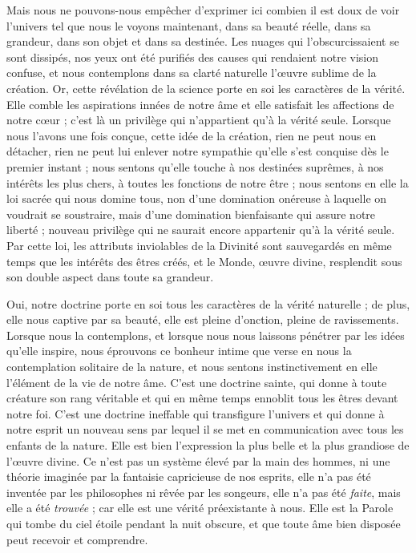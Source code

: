 \documentclass[a4paper, 11pt, oneside]{article}
\begin{document}
Mais nous ne pouvons-nous empêcher d'exprimer ici combien il est doux de voir l'univers tel que nous le voyons maintenant, dans sa beauté réelle, dans sa grandeur, dans son objet et dans sa destinée. Les nuages qui l'obscurcissaient se sont dissipés, nos yeux ont été purifiés des causes qui rendaient notre vision confuse, et nous contemplons dans sa clarté naturelle l'œuvre sublime de la création. Or, cette révélation de la science porte en soi les caractères de la vérité. Elle comble les aspirations innées de notre âme et elle satisfait les affections de notre cœur ; c'est là un privilège qui n'appartient qu'à la vérité seule. Lorsque nous l'avons une fois conçue, cette idée de la création, rien ne peut nous en détacher, rien ne peut lui enlever notre sympathie qu'elle s'est conquise dès le premier instant ; nous sentons qu'elle touche à nos destinées suprêmes, à nos intérêts les plus chers, à toutes les fonctions de notre être ; nous sentons en elle la loi sacrée qui nous domine tous, non d'une domination onéreuse à laquelle on voudrait se soustraire, mais d'une domination bienfaisante qui assure notre liberté ; nouveau privilège qui ne saurait encore appartenir qu'à la vérité seule. Par cette loi, les attributs inviolables de la Divinité sont sauvegardés en même temps que les intérêts des êtres créés, et le Monde, œuvre divine, resplendit sous son double aspect dans toute sa grandeur.

Oui, notre doctrine porte en soi tous les caractères de la vérité naturelle ; de plus, elle nous captive par sa beauté, elle est pleine d'onction, pleine de ravissements. Lorsque nous la contemplons, et lorsque nous nous laissons pénétrer par les idées qu'elle inspire, nous éprouvons ce bonheur intime que verse en nous la contemplation solitaire de la nature, et nous sentons instinctivement en elle l'élément de la vie de notre âme. C'est une doctrine sainte, qui donne à toute créature son rang véritable et qui en même temps ennoblit tous les êtres devant notre foi. C'est une doctrine ineffable qui transfigure l'univers et qui donne à notre esprit un nouveau sens par lequel il se met en communication avec tous les enfants de la nature. Elle est bien l'expression la plus belle et la plus grandiose de l'œuvre divine. Ce n'est pas un système élevé par la main des hommes, ni une théorie imaginée par la fantaisie capricieuse de nos esprits, elle n'a pas été inventée par les philosophes ni rêvée par les songeurs, elle n'a pas été \emph{faite}, mais elle a été \emph{trouvée} ; car elle est une vérité préexistante à nous. Elle est la Parole qui tombe du ciel étoile pendant la nuit obscure, et que toute âme bien disposée peut recevoir et comprendre.
\end{document}
